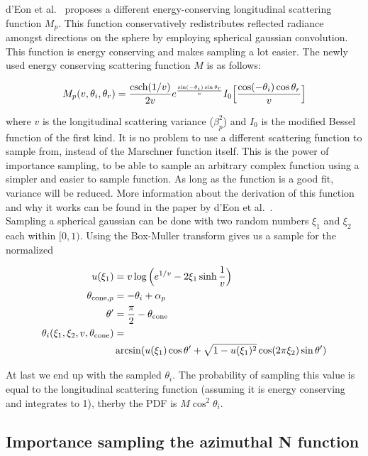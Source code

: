 \documentclass[11pt,a4paper]{report}
\begin{document}
d'Eon et al.~\cite{eon2011} proposes a different energy-conserving longitudinal scattering function $M_p$. This function conservatively redistributes reflected radiance amongst directions on the sphere by employing spherical gaussian convolution. This function is energy conserving and makes sampling a lot easier. The newly used energy conserving scattering function $M$ is as follows:

\begin{equation}
M_p(v, \theta_i, \theta_r) = \frac{\textnormal{csch}(1/v)}{2v} e^{\frac{\sin(-\theta_i)\sin\theta_r}{v}} I_0 \Big [ \frac{\cos(-\theta_i) \cos \theta_r}{v} \Big ]
\end{equation}

where $v$ is the longitudinal scattering variance ($\beta_p^2$) and $I_0$ is the modified Bessel function of the first kind. It is no problem to use a different scattering function to sample from, instead of the Marschner function itself. This is the power of importance sampling, to be able to sample an arbitrary complex function using a simpler and easier to sample function. As long as the function is a good fit, variance will be reduced. More information about the derivation of this function and why it works can be found in the paper by d'Eon et al.~\cite{eon2011}.\\

Sampling a spherical gaussian can be done with two random numbers $\xi_1$ and $\xi_2$ each within $[0, 1)$. Using the Box-Muller transform gives us a sample for the normalized


\begin{align}
u(\xi_1) &= v \log \Big (e^{1/v} - 2\xi_1 \sinh \frac{1}{v} \Big ) \\
\theta_{\textnormal{cone}, p} &= -\theta_i + \alpha_p\\
\theta' &= \frac{\pi}{2} - \theta_{\textnormal{cone}} \\
\theta_i(\xi_1, \xi_2, v, \theta_{\textnormal{cone}}) &= \nonumber \\
& \arcsin(u(\xi_1) \cos \theta' + \sqrt{1 - u(\xi_1)^2} \cos(2\pi \xi_2) \sin \theta')
\end{align}

At last we end up with the sampled $\theta_i$. The probability of sampling this value is equal to the longitudinal scattering function (assuming it is energy conserving and integrates to 1), therby the PDF is $M \cos^2 \theta_i$.


\subsection{Importance sampling the azimuthal N function}
\end{document}
